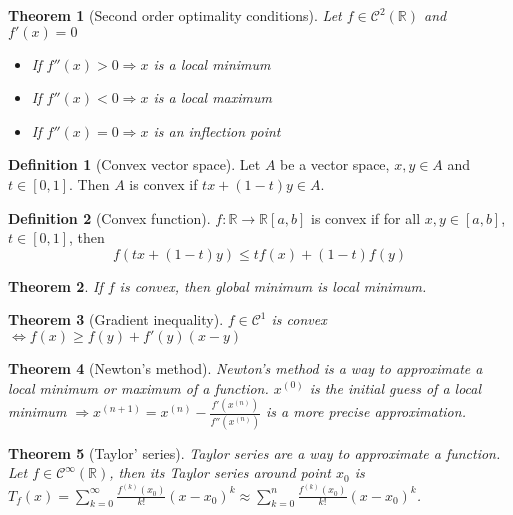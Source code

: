 \documentclass{article}
\newcommand{\DS}{\displaystyle}
\newcommand{\Ar}{\Rightarrow}
\newcommand{\fOnR}[1]{#1 : \mathbb{R} \rightarrow \mathbb{R}}
\newcommand{\intcc}[1]{\left[#1\right]}
\theoremstyle{definition}
\newtheorem{definition}{Definition}[section]
\theoremstyle{definition}
\theoremstyle{plain}
\newtheorem{theorem}{Theorem}[section]
\theoremstyle{plain}
\theoremstyle{plain}
\theoremstyle{plain}
\theoremstyle{definition}
\theoremstyle{remark}
\theoremstyle{remark}
\theoremstyle{remark}
\theoremstyle{remark}
\newcommand{\R}{\mathbb{R}}
\newcommand{\C}{\mathcal{C}}
\begin{document}
\begin{theorem}[Second order optimality conditions]
  Let $f \in \C^2(\R)$ and $f'(x) = 0$
  \begin{itemize}
  \item If $f''(x) > 0 \Ar x$ is a local minimum
  \item If $f''(x) < 0 \Ar x$ is a local maximum
  \item If $f''(x) = 0 \Ar x$ is an inflection point
  \end{itemize}
\end{theorem}



\begin{definition}[Convex vector space]
  Let $A$ be a vector space, $x,y \in A$ and $t \in \intcc{0,1}$. Then $A$ is convex if $tx + (1-t)y \in A$.
\end{definition}


\begin{definition}[Convex function]
  $\fOnR{f}{\intcc{a,b}}$ is convex if for all $x,y \in \intcc{a,b}$, $t \in \intcc{0,1}$, then
  \[
  f(tx+(1-t)y) \leq tf(x) + (1-t)f(y)
  \]
\end{definition}


\begin{theorem}
  If $f$ is convex, then global minimum is local minimum.
\end{theorem}



\begin{theorem}[Gradient inequality]
  $f \in \C^1$ is convex $\iff f(x) \geq f(y) + f'(y)(x-y)$
\end{theorem}



\begin{theorem}[Newton's method]
  Newton's method is a way to approximate a local minimum or maximum of a function. $x^{(0)}$ is the initial guess of a local minimum $\Ar x^{(n+1)} = x^{(n)} - \frac{f'(x^{(n)})}{f''(x^{(n)})}$ is a more precise approximation.
\end{theorem}




\begin{theorem}[Taylor' series]
  Taylor series are a way to approximate a function. Let $f \in \C^\infty(\R)$, then its Taylor series around point $x_0$ is $\DS T_f(x) = \sum_{k=0}^\infty \frac{f^{(k)}(x_0)}{k!}(x-x_0)^k \approx \sum_{k=0}^n \frac{f^{(k)}(x_0)}{k!}(x-x_0)^k$.
\end{theorem}
\end{document}
